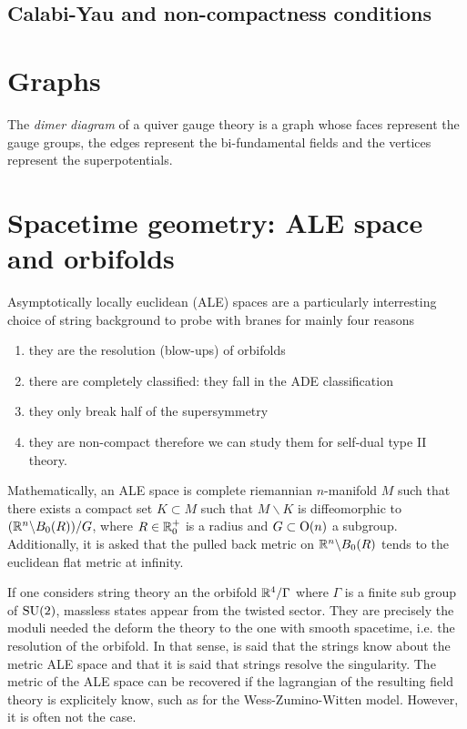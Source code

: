         

    \subsection{Calabi-Yau and non-compactness conditions}

\section{Graphs}

    The \emph{dimer diagram} of a quiver gauge theory is a graph whose faces represent the gauge groups, the edges represent the bi-fundamental fields and the vertices represent the superpotentials.


\section{Spacetime geometry: ALE space and orbifolds}\label{app:spacetimegeom}

    Asymptotically locally euclidean (ALE) spaces are a particularly interresting choice of string background to probe with branes for mainly four reasons
    \begin{enumerate}[label=(\roman*)]
        \item they are the resolution (blow-ups) of orbifolds
        \item there are completely classified: they fall in the ADE classification
        \item they only break half of the supersymmetry
        \item they are non-compact therefore we can study them for self-dual type II theory\marker.
    \end{enumerate}
    Mathematically, an ALE space is complete riemannian $n$-manifold $M$ such that there exists a compact set $K\subset M$ such that $M\backslash K$ is diffeomorphic to $(\mathbb{R}^n\backslash B_0(R))/G$, where $R\in\mathbb{R}^+_0$ is a radius and $G\subset\text{O}(n)$ a subgroup. Additionally, it is asked that the pulled back metric on $\mathbb{R}^n\backslash B_0(R)$ tends to the euclidean flat metric at infinity.

    If one considers string theory an the orbifold $\mathbb{R}^4/\Gamma$ where $\Gamma$ is a finite sub group of $\text{SU}(2)$, massless states appear from the twisted sector. They are precisely the moduli needed the deform the theory to the one with smooth spacetime, i.e. the resolution of the orbifold. In that sense, is said that the strings know about the metric ALE space and that it is said that strings resolve the singularity. The metric of the ALE space can be recovered if the lagrangian of the resulting field theory is explicitely know, such as for the Wess-Zumino-Witten model. However, it is often not the case.

